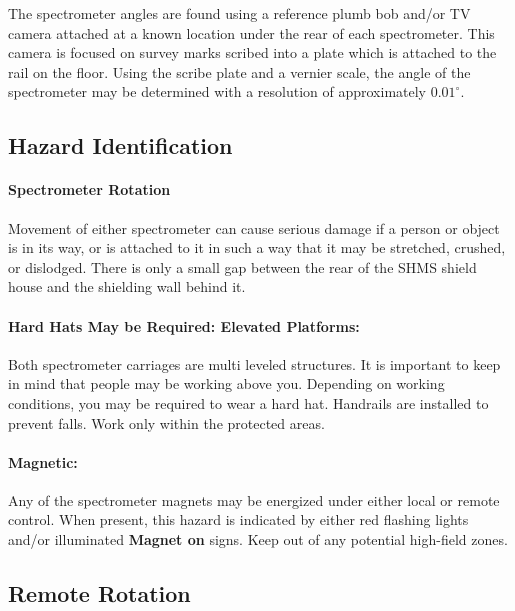 {The spectrometer angles are found using a reference plumb bob and/or TV camera
attached at a known location under the rear of each spectrometer.
This camera is focused on survey marks scribed into a plate which is attached to
the rail on the floor. Using the scribe plate and a vernier scale, the angle of the
spectrometer may be determined with a resolution of approximately $0.01^{\circ}$.

	
\begin{safetyen}{0}{0}
\subsection{Hazard Identification}
\paragraph{Spectrometer Rotation}

Movement of either spectrometer can cause serious damage if a person or 
object is in its way,
or is attached to it in such a way that it may be stretched, crushed, or dislodged. 
There is only a small gap between the rear of the SHMS shield house and the
shielding wall behind it. 

\paragraph{Hard Hats May be Required: Elevated Platforms:} 

Both spectrometer carriages are multi leveled structures. It is important to keep in
mind that people may be working above you.  Depending on working conditions, 
you may be required to wear a hard hat. 
Handrails are installed to prevent falls. Work only within the protected areas.

\paragraph{Magnetic:}

Any of the spectrometer magnets may be energized under either local or remote
control. When present, this hazard is indicated by either red flashing lights and/or
illuminated \textbf{Magnet on} signs. Keep out of any potential high-field zones.

\end{safetyen}

\subsection{Remote Rotation}

}
